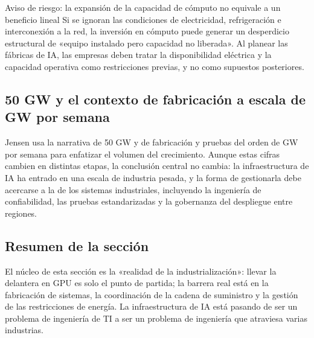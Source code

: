 \begin{warningbox}{Aviso de riesgo: la expansión de la capacidad de cómputo no equivale a un beneficio lineal}
Si se ignoran las condiciones de electricidad, refrigeración e interconexión a la red, la inversión en cómputo puede generar un desperdicio estructural de «equipo instalado pero capacidad no liberada». Al planear las fábricas de IA, las empresas deben tratar la disponibilidad eléctrica y la capacidad operativa como restricciones previas, y no como supuestos posteriores.
\end{warningbox}

\subsection{50 GW y el contexto de fabricación a escala de GW por semana}

Jensen usa la narrativa de 50 GW y de fabricación y pruebas del orden de GW por semana para enfatizar el volumen del crecimiento. Aunque estas cifras cambien en distintas etapas, la conclusión central no cambia: la infraestructura de IA ha entrado en una escala de industria pesada, y la forma de gestionarla debe acercarse a la de los sistemas industriales, incluyendo la ingeniería de confiabilidad, las pruebas estandarizadas y la gobernanza del despliegue entre regiones.

\subsection{Resumen de la sección}

El núcleo de esta sección es la «realidad de la industrialización»: llevar la delantera en GPU es solo el punto de partida; la barrera real está en la fabricación de sistemas, la coordinación de la cadena de suministro y la gestión de las restricciones de energía. La infraestructura de IA está pasando de ser un problema de ingeniería de TI a ser un problema de ingeniería que atraviesa varias industrias.

